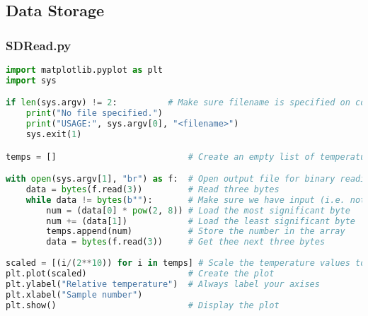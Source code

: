 \subsection{Data Storage}
\subsubsection{SDRead.py}
\begin{lstlisting}[language=Python]
import matplotlib.pyplot as plt
import sys

if len(sys.argv) != 2:			# Make sure filename is specified on command line
	print("No file specified.")	
	print("USAGE:", sys.argv[0], "<filename>")
	sys.exit(1)

temps = []							# Create an empty list of temperatures

with open(sys.argv[1], "br") as f:	# Open output file for binary reading
	data = bytes(f.read(3))			# Read three bytes
	while data != bytes(b""):		# Make sure we have input (i.e. not EOF)
		num = (data[0] * pow(2, 8))	# Load the most significant byte
		num += (data[1])			# Load the least significant byte
		temps.append(num)			# Store the number in the array
		data = bytes(f.read(3))		# Get thee next three bytes
	
scaled = [(i/(2**10)) for i in temps] # Scale the temperature values to between 0-1
plt.plot(scaled)					# Create the plot
plt.ylabel("Relative temperature")	# Always label your axises
plt.xlabel("Sample number")			
plt.show()							# Display the plot
\end{lstlisting}


